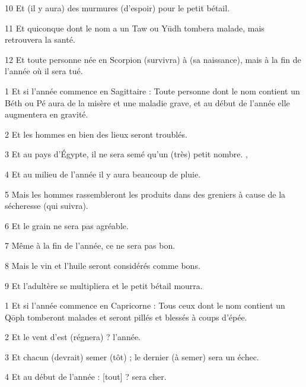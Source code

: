 \par 10 Et (il y aura) des murmures (d'espoir) pour le petit bétail.

\par 11 Et quiconque dont le nom a un Taw ou Yūdh tombera malade, mais retrouvera la santé.

\par 12 Et toute personne née en Scorpion (survivra) à (sa naissance), mais à la fin de l'année où il sera tué.


\par 1 Et si l'année commence en Sagittaire : Toute personne dont le nom contient un Béth ou Pé aura de la misère et une maladie grave, et au début de l'année elle augmentera en gravité.

\par 2 Et les hommes en bien des lieux seront troublés.

\par 3 Et au pays d'Égypte, il ne sera semé qu'un (très) petit nombre. ,

\par 4 Et au milieu de l'année il y aura beaucoup de pluie.

\par 5 Mais les hommes rassembleront les produits dans des greniers à cause de la sécheresse (qui suivra).

\par 6 Et le grain ne sera pas agréable.

\par 7 Même à la fin de l'année, ce ne sera pas bon.

\par 8 Mais le vin et l'huile seront considérés comme bons.

\par 9 Et l'adultère se multipliera et le petit bétail mourra.


\par 1 Et si l'année commence en Capricorne : Tous ceux dont le nom contient un Qōph tomberont malades et seront pillés et blessés à coups d'épée.

\par 2 Et le vent d'est (régnera) ? l'année.

\par 3 Et chacun (devrait) semer (tôt) ; le dernier (à semer) sera un échec.

\par 4 Et au début de l'année : [tout] ? sera cher.


